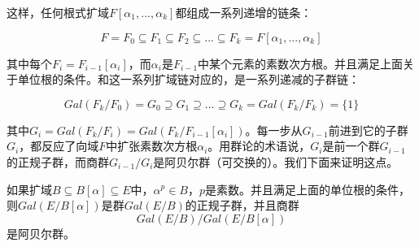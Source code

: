 \documentclass[b5paper]{ctexart}
\begin{document}
这样，任何根式扩域$F[\alpha_1, ..., \alpha_k]$都组成一系列递增的链条：

\[
F = F_0 \subseteq F_1 \subseteq F_2 \subseteq ... \subseteq F_k = F[\alpha_1, ..., \alpha_k]
\]

其中每个$F_i = F_{i-1}[\alpha_i]$，而$\alpha_i$是$F_{i-1}$中某个元素的素数次方根。并且满足上面关于单位根的条件。和这一系列扩域链对应的，是一系列递减的子群链：

\[
Gal(F_k/F_0) = G_0 \supseteq G_1 \supseteq ... \supseteq G_k = Gal(F_k/F_k) = \{1\}
\]

其中$G_i = Gal(F_k/F_i) = Gal(F_k/F_{i-1}[\alpha_i])$。每一步从$G_{i-1}$前进到它的子群$G_i$，都反应了向域$F$中扩张素数次方根$\alpha_i$。用群论的术语说，$G_i$是前一个群$G_{i-1}$的正规子群，而商群$G_{i-1}/G_i$是阿贝尔群（可交换的）。我们下面来证明这点。

\begin{theorem}
如果扩域$B \subseteq B[\alpha] \subseteq E$中，$\alpha^p \in B$，$p$是素数。并且满足上面的单位根的条件，则$Gal(E/B[\alpha])$是群$Gal(E/B)$的正规子群，并且商群
\[
Gal(E/B) / Gal(E/B[\alpha])
\]
是阿贝尔群。
\end{theorem}
\end{document}
